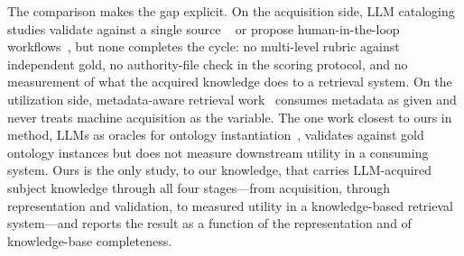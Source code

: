 The comparison makes the gap explicit. On the acquisition side, LLM
cataloging studies validate against a single source
~\cite{holstrom_llm_cataloging, characterising_ai_cataloguing,
dobreski_chatbots_cataloging, ital_genai_cataloging} or propose
human-in-the-loop workflows~\cite{koha_marc21_hitl}, but none completes the
cycle: no multi-level rubric against independent gold, no authority-file
check in the scoring protocol, and no measurement of what the acquired
knowledge does to a retrieval system. On the utilization side, metadata-aware
retrieval work~\cite{bm25f, prf_bm25, bergen, hysemrag, folkrag,
lund_rag_libraries, alima} consumes metadata as given and never treats
machine acquisition as the variable. The one work closest to ours in method,
LLMs as oracles for ontology instantiation~\cite{ciatto_llm_oracle_kbs},
validates against gold ontology instances but does not measure downstream
utility in a consuming system. Ours is the only study, to our knowledge,
that carries LLM-acquired subject knowledge through all four stages---from
acquisition, through representation and validation, to measured utility in a
knowledge-based retrieval system---and reports the result as a function of
the representation and of knowledge-base completeness.
